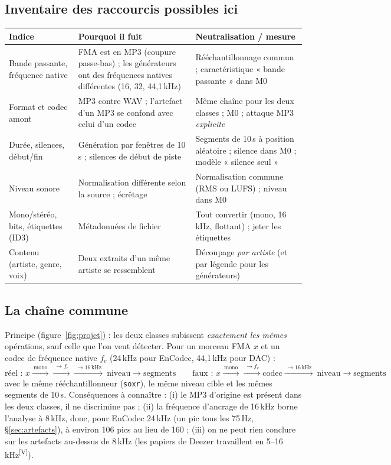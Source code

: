 \documentclass[10pt,a4paper]{article}
\newcommand{\sV}{\textsuperscript{\scriptsize\textcolor{green!40!black}{[V]}}}
\begin{document}
\subsection{Inventaire des raccourcis possibles ici}
\begin{center}\footnotesize
\begin{tabularx}{\textwidth}{@{}L{2.9cm}XL{4.6cm}@{}}
\toprule
\textbf{Indice} & \textbf{Pourquoi il fuit} & \textbf{Neutralisation / mesure}\\
\midrule
Bande passante, fréquence native & FMA est en MP3 (coupure passe-bas) ; les générateurs ont des fréquences natives différentes (16, 32, 44,1\,kHz) & Rééchantillonnage commun ; caractéristique « bande passante » dans M0\\
Format et codec amont & MP3 contre WAV ; l'artefact d'un MP3 se confond avec celui d'un codec & Même chaîne pour les deux classes ; M0 ; attaque MP3 \emph{explicite}\\
Durée, silences, début/fin & Génération par fenêtres de 10\,s ; silences de début de piste & Segments de 10\,s à position aléatoire ; silence dans M0 ; modèle « silence seul »\\
Niveau sonore & Normalisation différente selon la source ; écrêtage & Normalisation commune (RMS ou LUFS) ; niveau dans M0\\
Mono/stéréo, bits, étiquettes (ID3) & Métadonnées de fichier & Tout convertir (mono, 16\,kHz, flottant) ; jeter les étiquettes\\
Contenu (artiste, genre, voix) & Deux extraits d'un même artiste se ressemblent & Découpage \emph{par artiste} (et par légende pour les générateurs)\\
\bottomrule
\end{tabularx}
\end{center}

\subsection{La chaîne commune}
Principe (figure~\ref{fig:projet}) : les deux classes subissent \emph{exactement les mêmes} opérations, sauf celle que l'on veut détecter. Pour un morceau FMA $x$ et un codec de fréquence native $f_c$ (24\,kHz pour EnCodec, 44,1\,kHz pour DAC) :
\[
\text{réel : } x\xrightarrow{\ \text{mono}\ }\xrightarrow{\ \to f_c\ }\xrightarrow{\ \to16\,\text{kHz}\ }\ \text{niveau}\to\text{segments}\qquad
\text{faux : } x\xrightarrow{\ \text{mono}\ }\xrightarrow{\ \to f_c\ }\boxed{\text{codec}}\xrightarrow{\ \to16\,\text{kHz}\ }\ \text{niveau}\to\text{segments}
\]
avec le même rééchantillonneur (\texttt{soxr}), le même niveau cible et les mêmes segments de 10\,s. Conséquences à connaître : (i) le MP3 d'origine est présent dans les deux classes, il ne discrimine pas ; (ii) la fréquence d'ancrage de 16\,kHz borne l'analyse à 8\,kHz, donc, pour EnCodec 24\,kHz (un pic tous les 75\,Hz, §\ref{sec:artefacts}), à environ 106 pics au lieu de 160 ; (iii) on ne peut rien conclure sur les artefacts au-dessus de 8\,kHz (les papiers de Deezer travaillent en 5--16\,kHz\sV).
\end{document}
